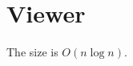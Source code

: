 \documentclass[11pt]{article}
\begin{document}
\section{Viewer}
The size is $O(n \log n)$. %
\end{document}
